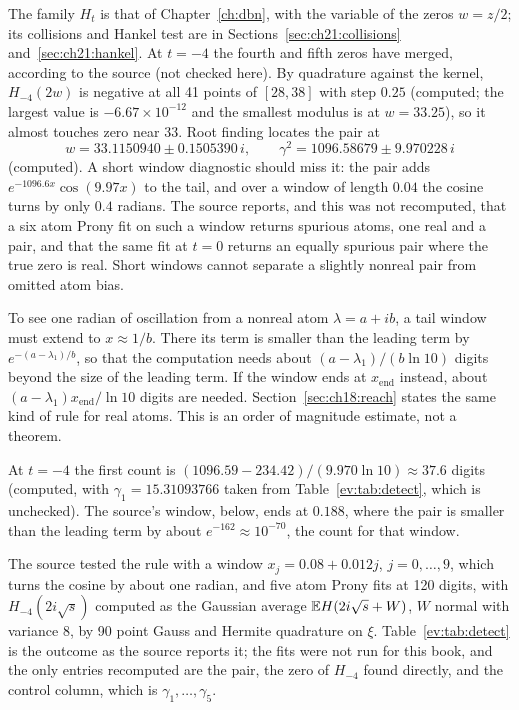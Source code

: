 The family $H_t$ is that of Chapter~\ref{ch:dbn}, with the variable of the zeros $w=z/2$; its collisions and Hankel test are in Sections~\ref{sec:ch21:collisions} and~\ref{sec:ch21:hankel}. At $t=-4$ the fourth and fifth zeros have merged, according to the source (not checked here). By quadrature against the kernel, $H_{-4}(2w)$ is negative at all 41 points of $[28,38]$ with step $0.25$ (computed; the largest value is $-6.67\times10^{-12}$ and the smallest modulus is at $w=33.25$), so it almost touches zero near $33$. Root finding locates the pair at
\[
w=33.1150940\pm0.1505390\,i,\qquad\gamma^2=1096.58679\pm9.970228\,i
\]
(computed). A short window diagnostic should miss it: the pair adds $e^{-1096.6x}\cos(9.97x)$ to the tail, and over a window of length $0.04$ the cosine turns by only $0.4$ radians. The source reports, and this was not recomputed, that a six atom Prony fit on such a window returns spurious atoms, one real and a pair, and that the same fit at $t=0$ returns an equally spurious pair where the true zero is real. %
Short windows cannot separate a slightly nonreal pair from omitted atom bias.

\begin{remark}\label{ev:rem:detect}
To see one radian of oscillation from a nonreal atom $\lambda=a+ib$, a tail window must extend to $x\approx1/b$. There its term is smaller than the leading term by $e^{-(a-\lambda_1)/b}$, so that the computation needs about $(a-\lambda_1)/(b\ln10)$ digits beyond the size of the leading term. If the window ends at $x_{\mathrm{end}}$ instead, about $(a-\lambda_1)x_{\mathrm{end}}/\ln10$ digits are needed. Section~\ref{sec:ch18:reach} states the same kind of rule for real atoms. This is an order of magnitude estimate, not a theorem.
\end{remark}

At $t=-4$ the first count is $(1096.59-234.42)/(9.970\ln10)\approx37.6$ digits (computed, with $\gamma_1=15.31093766$ taken from Table~\ref{ev:tab:detect}, which is unchecked). The source's window, below, ends at $0.188$, where the pair is smaller than the leading term by about $e^{-162}\approx10^{-70}$, the count for that window.

The source tested the rule with a window $x_j=0.08+0.012j$, $j=0,\ldots,9$, which turns the cosine by about one radian, and five atom Prony fits at 120 digits, with $H_{-4}(2i\sqrt s)$ computed as the Gaussian average $\mathbb{E} H(2i\sqrt s+W)$, $W$ normal with variance $8$, by 90 point Gauss and Hermite quadrature on $\xi$. Table~\ref{ev:tab:detect} is the outcome as the source reports it; the fits were not run for this book, and the only entries recomputed are the pair, the zero of $H_{-4}$ found directly, and the control column, which is $\gamma_1,\ldots,\gamma_5$.

